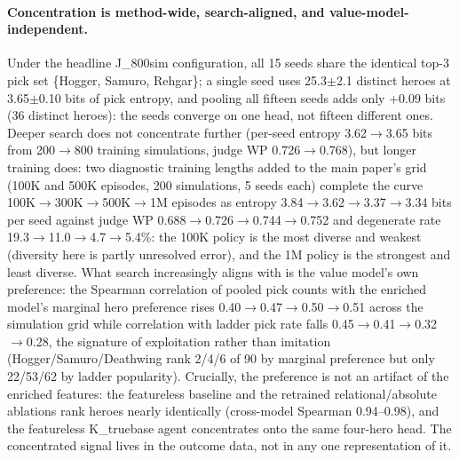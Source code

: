 \documentclass[journal]{IEEEtran}
\begin{document}
\paragraph{Concentration is method-wide, search-aligned, and value-model-independent.} Under the headline J\_800sim configuration, all 15 seeds share the identical top-3 pick set \{Hogger, Samuro, Rehgar\}; a single seed uses 25.3$\pm$2.1 distinct heroes at 3.65$\pm$0.10 bits of pick entropy, and pooling all fifteen seeds adds only +0.09 bits (36 distinct heroes): the seeds converge on one head, not fifteen different ones. Deeper search does not concentrate further (per-seed entropy 3.62$\to$3.65 bits from 200$\to$800 training simulations, judge WP 0.726$\to$0.768), but longer training does: two diagnostic training lengths added to the main paper's grid (100K and 500K episodes, 200 simulations, 5 seeds each) complete the curve 100K$\to$300K$\to$500K$\to$1M episodes as entropy 3.84$\to$3.62$\to$3.37$\to$3.34 bits per seed against judge WP 0.688$\to$0.726$\to$0.744$\to$0.752 and degenerate rate 19.3$\to$11.0$\to$4.7$\to$5.4\%: the 100K policy is the most diverse and weakest (diversity here is partly unresolved error), and the 1M policy is the strongest and least diverse. What search increasingly aligns with is the value model's own preference: the Spearman correlation of pooled pick counts with the enriched model's marginal hero preference rises 0.40$\to$0.47$\to$0.50$\to$0.51 across the simulation grid while correlation with ladder pick rate falls 0.45$\to$0.41$\to$0.32$\to$0.28, the signature of exploitation rather than imitation (Hogger/Samuro/Deathwing rank 2/4/6 of 90 by marginal preference but only 22/53/62 by ladder popularity). Crucially, the preference is not an artifact of the enriched features: the featureless baseline and the retrained relational/absolute ablations rank heroes nearly identically (cross-model Spearman 0.94--0.98), and the featureless K\_truebase agent concentrates onto the same four-hero head. The concentrated signal lives in the outcome data, not in any one representation of it.
\end{document}
